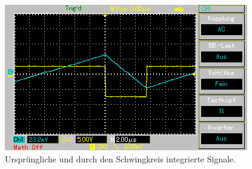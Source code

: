 \begin{figure}[H]
\begin{minipage}{0.48\textwidth}
        \vspace{1em}
        \includegraphics[width=\textwidth]{content/Grafiken/MAP004.png}
        \vspace{1em}
    \end{minipage}
    \caption{Ursprüngliche und durch den Schwingkreis integrierte Signale.}
\end{figure}
\noindent
